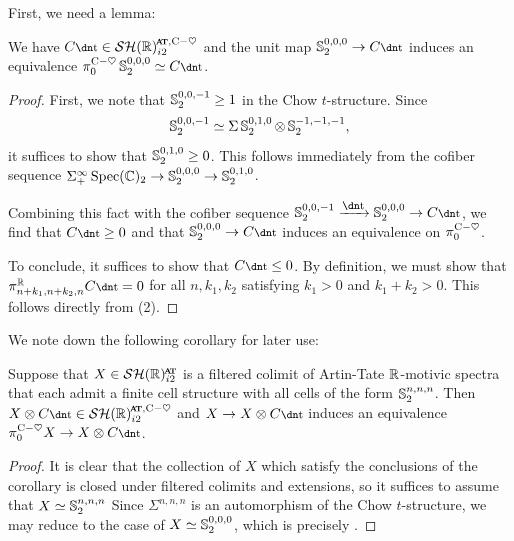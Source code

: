 First, we need a lemma:

\begin{lem} \label{lem:Cta-pi0}
  We have $C\ta \in \SHRatch$ and the unit map $\Ss_2 ^{0,0,0} \to C\ta$ induces an equivalence $\pi_0 ^{\ch} \Ss_2 ^{0,0,0} \simeq C\ta$.
\end{lem}

\begin{proof}
  First, we note that $\operatorname{\mathbb{S}}_2^{0,0,-1} \geq 1$ in the Chow $t$-structure.
  Since $$\operatorname{\mathbb{S}}_2^{0,0,-1} \simeq \Sigma \operatorname{\mathbb{S}}_2^{0,1,0} \otimes \operatorname{\mathbb{S}}_2^{-1,-1,-1},$$ it suffices to show that $\operatorname{\mathbb{S}}_2^{0,1,0} \geq 0$.
  This follows immediately from the cofiber sequence $\Sigma^{\infty} _+ \operatorname{\mathrm{Spec}}(\mathbb{C})_2 \to \operatorname{\mathbb{S}}_2^{0,0,0} \to \operatorname{\mathbb{S}}_2^{0,1,0}$.

  Combining this fact with the cofiber sequence $\Ss_2^{0,0,-1} \xrightarrow{\ta} \Ss_2^{0,0,0} \to C\ta$, we find that $C\ta \geq 0$ and that $\Ss_2^{0,0,0} \to C\ta$ induces an equivalence on $\pi_0 ^{\mathrm{C}-\heartsuit}$.

  To conclude, it suffices to show that $C\ta \leq 0$.
  By definition, we must show that $\pi_{n+k_1, n+k_2, n} ^{\R} C\ta = 0$ for all $n,k_1,k_2$ satisfying $k_1 > 0$ and $k_1 + k_2 > 0$.
  This follows directly from (2).
\end{proof}

We note down the following corollary for later use: 

\begin{cor} \label{cor:cta-homotopy}
  Suppose that $X \in \SHRat$ is a filtered colimit of Artin-Tate $\mathbb{R}$-motivic spectra that each admit a finite cell structure with all cells of the form $\operatorname{\mathbb{S}}_2^{n,n,n}$.
  Then $X \otimes C\ta \in \SHRatch$ and $X \to X \otimes C\ta$ induces an equivalence $\pi_0 ^{\ch} X \to X \otimes C\ta$.
\end{cor}

\begin{proof}
  It is clear that the collection of $X$ which satisfy the conclusions of the corollary is closed under filtered colimits and extensions, so it suffices to assume that $X \simeq \operatorname{\mathbb{S}}_2^{n,n,n}$
  Since $\Sigma^{n,n,n}$ is an automorphism of the Chow $t$-structure, we may reduce to the case of $X \simeq \operatorname{\mathbb{S}}_2^{0,0,0}$, which is precisely .
\end{proof}


